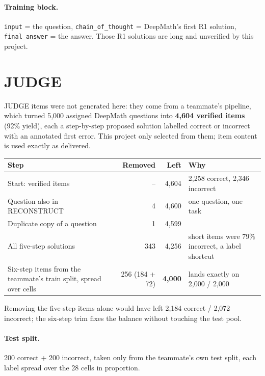 \documentclass[11pt,a4paper]{article}
\newcommand{\code}[1]{\texttt{#1}}
\begin{document}
\paragraph{Training block.} \code{input} = the question, \code{chain\_of\_thought} = DeepMath's first R1 solution, \code{final\_answer} = the answer. Those R1 solutions are long and unverified by this project.

\section{JUDGE}

JUDGE items were not generated here: they come from a teammate's pipeline, which turned 5,000 assigned DeepMath questions into \textbf{4,604 verified items} (92\% yield), each a step-by-step proposed solution labelled correct or incorrect with an annotated first error. This project only selected from them; item content is used exactly as delivered.

\begin{table}[H]
\centering\small
\begin{tabularx}{\textwidth}{@{}Lrr L@{}}
\toprule
Step & Removed & Left & Why \\
\midrule
Start: verified items & -- & 4,604 & 2,258 correct, 2,346 incorrect \\
Question also in RECONSTRUCT & 4 & 4,600 & one question, one task \\
Duplicate copy of a question & 1 & 4,599 & \\
All five-step solutions & 343 & 4,256 & short items were 79\% incorrect, a label shortcut \\
Six-step items from the teammate's train split, spread over cells & 256 (184 + 72) & \textbf{4,000} & lands exactly on 2,000 / 2,000 \\
\bottomrule
\end{tabularx}
\end{table}

Removing the five-step items alone would have left 2,184 correct / 2,072 incorrect; the six-step trim fixes the balance without touching the test pool.

\paragraph{Test split.} 200 correct + 200 incorrect, taken only from the teammate's own test split, each label spread over the 28 cells in proportion.
\end{document}
